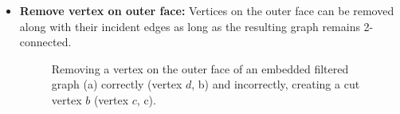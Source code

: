 \begin{itemize}
	\item \textbf{Remove vertex on outer face:} Vertices on the outer face can be removed along with their incident edges as long as the resulting graph remains 2-connected.
\begin{figure}[H]
	\centering
	\quad
	\quad
	\caption{Removing a vertex on the outer face of an embedded filtered graph (a) correctly (vertex $d$, b) and incorrectly, creating a cut vertex $b$ (vertex $c$, c).}
	\label{fig:transformation}
\end{figure}


\end{itemize}
